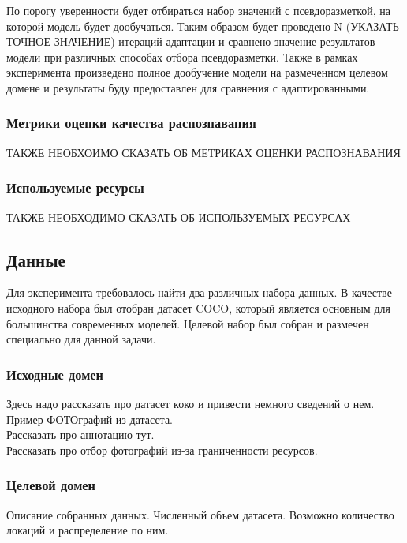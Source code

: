 По порогу уверенности будет отбираться набор значений с псевдоразметкой, на которой модель будет дообучаться. Таким образом будет проведено N (УКАЗАТЬ ТОЧНОЕ ЗНАЧЕНИЕ) итераций адаптации и сравнено значение результатов модели при различных способах отбора псевдоразметки. Также в рамках эксперимента произведено полное дообучение модели на размеченном целевом домене и результаты буду предоставлен для сравнения с адаптированными.

\subsubsection*{Метрики оценки качества распознавания}

ТАКЖЕ НЕОБХОИМО СКАЗАТЬ ОБ МЕТРИКАХ ОЦЕНКИ РАСПОЗНАВАНИЯ

\subsubsection*{Используемые ресурсы}

ТАКЖЕ НЕОБХОДИМО СКАЗАТЬ ОБ ИСПОЛЬЗУЕМЫХ РЕСУРСАХ


\subsection{Данные}

Для эксперимента требовалось найти два различных набора данных. В качестве исходного набора был отобран датасет COCO, который является основным для большинства современных моделей. Целевой набор был собран и размечен специально для данной задачи.

\subsubsection*{Исходные домен}

Здесь надо рассказать про датасет коко и привести немного сведений о нем.\\
Пример ФОТОграфий из датасета.\\
Рассказать про аннотацию тут.\\
Рассказать про отбор фотографий из-за граниченности ресурсов.

\subsubsection*{Целевой домен}

Описание собранных данных. Численный объем датасета. Возможно количество локаций и распределение по ним.

